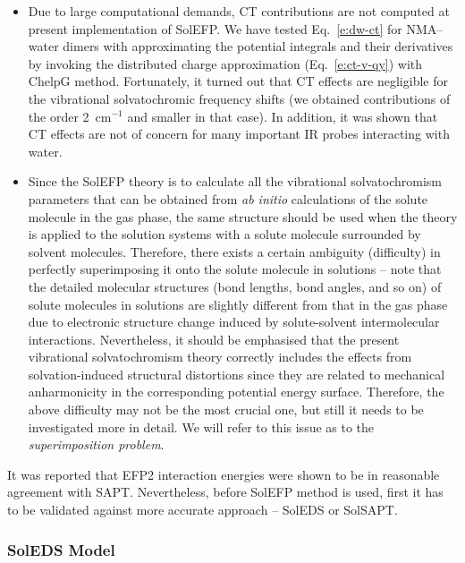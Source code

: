 \documentclass[a4paper,titlepage,twoside,fleqn,12pt]{book}
\begin{document}
\begin{refsection}
\begin{itemize}
 \item Due to
large computational demands, CT contributions are not computed at present implementation
of SolEFP. We have tested Eq.~\eqref{e:dw-ct} for NMA--water dimers 
with approximating the potential integrals and their derivatives by invoking the distributed
charge approximation (Eq.~\eqref{e:ct-v-qy}) with ChelpG method. \citep{Breneman.Wiberg.JCC.1990} 
Fortunately,
it turned out that CT effects are negligible for the vibrational solvatochromic frequency shifts
(we obtained contributions of the order 2~cm$^{-1}$ and smaller in that case). In addition, it was shown
that CT effects are not of concern 
for many important IR probes interacting with water. \citep{Lee.Choi.Cho.PCCP.2010,Blasiak.Cho.JCP.2014}
 \item Since the SolEFP theory is to calculate all the vibrational solvatochromism parameters 
that can be obtained from \emph{ab initio} calculations of the solute molecule in the gas phase, 
the same structure should be used when the theory is applied to the solution systems 
with a solute molecule surrounded by solvent molecules. Therefore, there exists a certain 
ambiguity (difficulty) in perfectly superimposing it onto the solute molecule in solutions 
-- note that the detailed molecular structures (bond lengths, bond angles, and so on) 
of solute molecules in solutions are slightly different from that in the gas phase 
due to electronic structure change induced by solute\hyp{}solvent intermolecular interactions. 
Nevertheless, it should be emphasised that the present vibrational solvatochromism theory 
correctly includes the effects from solvation\hyp{}induced structural distortions 
since they are related to mechanical anharmonicity in the corresponding potential 
energy surface. Therefore, the above difficulty may not be the most crucial one, 
but still it needs to be investigated more in detail. We will refer to this issue as to
the \emph{superimposition problem}.
\end{itemize}
%
It was reported that EFP2 interaction energies were shown to be
in reasonable agreement 
with SAPT. \citep{Flick.Kosenkov.Hohenstein.Sherrill.Slipchenko.JCTC.2012} 
Nevertheless, before SolEFP method is used, first it has to be validated
against more accurate approach -- SolEDS or SolSAPT. 

\subsubsection{SolEDS Model\label{s:soleds}}


\end{refsection}
\end{document}
